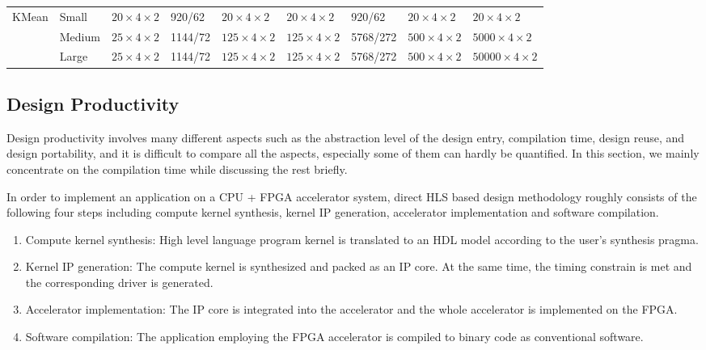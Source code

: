 \begin{table*}[htpb]
\begin{tabular}{l|l|l|l|l|l|l|l|l}
\multirow{3}{*}{KMean} & Small & $20 \times 4 \times 2$ & 920/62 & $20 \times 4 \times 2$ & $20 \times 4 \times 2$ & 920/62 & $20 \times 4 \times 2$ & $20 \times 4 \times 2$ \\ \cline{2-9} 
                 & Medium & $25 \times 4 \times 2$ & 1144/72 & $125 \times 4 \times 2$ & $125 \times 4 \times 2$ & 5768/272 & $500 \times 4 \times 2$ & $5000 \times 4 \times 2$ \\ \cline{2-9} 
                 & Large & $25 \times 4 \times 2$ & 1144/72 & $125 \times 4 \times 2$ & $125 \times 4 \times 2$ & 5768/272 & $500 \times 4 \times 2$ & $50000 \times 4 \times 2$  \\ \hline
\end{tabular}
\end{table*}

\subsection{Design Productivity}
Design productivity involves many different aspects such as the abstraction level of the design entry, compilation time, design reuse, and design portability, and it is difficult to compare all the aspects, especially some of them can hardly be quantified. In this section, we mainly concentrate on the compilation time while discussing the rest briefly.

In order to implement an application on a CPU + FPGA accelerator system, direct HLS based design methodology roughly consists of the following four steps including compute kernel synthesis, kernel IP generation, accelerator implementation and software compilation. 
\begin{enumerate}
\item Compute kernel synthesis: High level language program kernel is translated to an HDL model according to the user's synthesis pragma. 
\item Kernel IP generation: The compute kernel is synthesized and packed as an IP core. At the same time, the timing constrain is met and the corresponding driver is generated. 
\item Accelerator implementation: The IP core is integrated into the accelerator and the whole accelerator is implemented on the FPGA. 
\item Software compilation: The application employing the FPGA accelerator is compiled to binary code as conventional software.
\end{enumerate}


